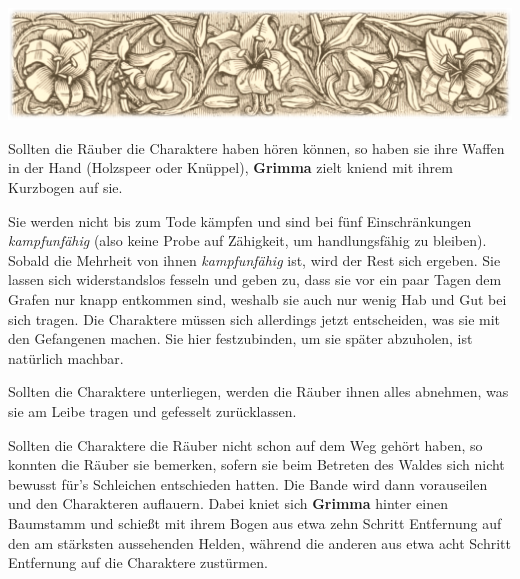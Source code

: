 \begin{center}
\includegraphics[width=0.9\linewidth]{offene_lizenz/riverdee.png}
\end{center}


Sollten die Räuber die Charaktere haben hören können, so haben sie ihre Waffen in der Hand (Holzspeer oder Knüppel), \textbf{Grimma} zielt kniend mit ihrem Kurzbogen auf sie.

\vfill


\kreaturraeuber

Sie werden nicht bis zum Tode kämpfen und sind bei fünf Einschränkungen \textit{kampfunfähig} (also keine Probe auf Zähigkeit, um handlungsfähig zu bleiben). Sobald die Mehrheit von ihnen \textit{kampfunfähig} ist, wird der Rest sich ergeben. Sie lassen sich widerstandslos fesseln und geben zu, dass sie vor ein paar Tagen dem Grafen nur knapp entkommen sind, weshalb sie auch nur wenig Hab und Gut bei sich tragen.
Die Charaktere müssen sich allerdings jetzt entscheiden, was sie mit den Gefangenen machen. Sie hier festzubinden, um sie später abzuholen, ist natürlich machbar.

Sollten die Charaktere unterliegen, werden die Räuber ihnen alles abnehmen, was sie am Leibe tragen und gefesselt zurücklassen. 


Sollten die Charaktere die Räuber nicht schon auf dem Weg gehört haben, so konnten die Räuber sie bemerken, sofern sie beim Betreten des Waldes sich nicht bewusst für's Schleichen entschieden hatten. Die Bande wird dann vorauseilen und den Charakteren auflauern. Dabei kniet sich \textbf{Grimma} hinter einen Baumstamm und schießt mit ihrem Bogen aus etwa zehn Schritt Entfernung auf den am stärksten aussehenden Helden, während die anderen aus etwa acht Schritt Entfernung auf die Charaktere zustürmen. 


